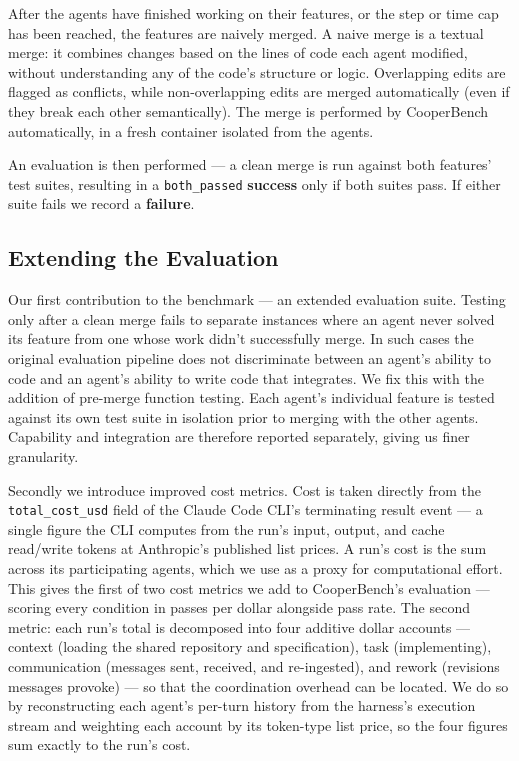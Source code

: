 \documentclass[11pt,a4paper]{article}
\begin{document}
After the agents have finished working on their features, or the step or time cap has been reached, the features are naively merged. A naive merge is a textual merge: it combines changes based on the lines of code each agent modified, without understanding any of the code's structure or logic. Overlapping edits are flagged as conflicts, while non-overlapping edits are merged automatically (even if they break each other semantically). The merge is performed by CooperBench automatically, in a fresh container isolated from the agents.

An evaluation is then performed --- a clean merge is run against both features' test suites, resulting in a \texttt{both\_passed} \textbf{success} only if both suites pass. If either suite fails we record a \textbf{failure}.

\subsection{Extending the Evaluation}\label{sec:extendedeval}

Our first contribution to the benchmark --- an extended evaluation suite. Testing only after a clean merge fails to separate instances where an agent never solved its feature from one whose work didn't successfully merge. In such cases the original evaluation pipeline does not discriminate between an agent's ability to code and an agent's ability to write code that integrates. We fix this with the addition of pre-merge function testing. Each agent's individual feature is tested against its own test suite in isolation prior to merging with the other agents. Capability and integration are therefore reported separately, giving us finer granularity.

Secondly we introduce improved cost metrics. Cost is taken directly from the \texttt{total\_cost\_usd} field of the Claude Code CLI's terminating result event --- a single figure the CLI computes from the run's input, output, and cache read/write tokens at Anthropic's published list prices. A run's cost is the sum across its participating agents, which we use as a proxy for computational effort. This gives the first of two cost metrics we add to CooperBench's evaluation --- scoring every condition in passes per dollar alongside pass rate. The second metric: each run's total is decomposed into four additive dollar accounts --- context (loading the shared repository and specification), task (implementing), communication (messages sent, received, and re-ingested), and rework (revisions messages provoke) --- so that the coordination overhead can be located. We do so by reconstructing each agent's per-turn history from the harness's execution stream and weighting each account by its token-type list price, so the four figures sum exactly to the run's cost.
\end{document}
